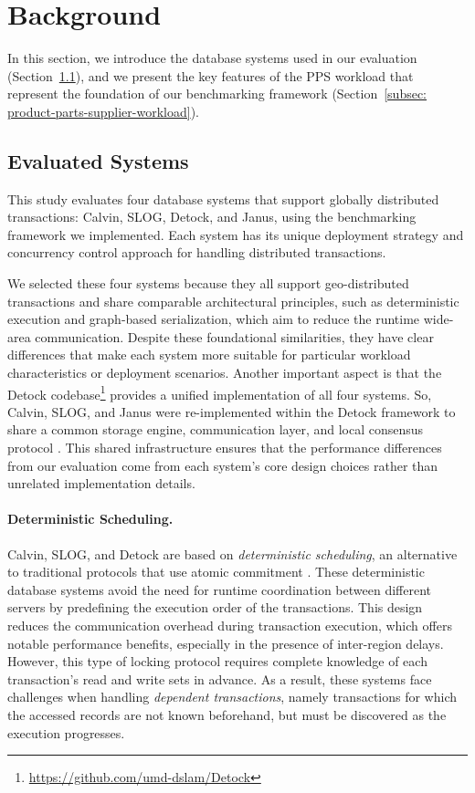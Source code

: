 \section{Background}
\label{sec: background}
In this section, we introduce the database systems used in our evaluation (Section~\ref{subsec: evaluated-systems}), and we present the key features of the PPS workload that represent the foundation of our benchmarking framework (Section~\ref{subsec: product-parts-supplier-workload}).

\subsection{Evaluated Systems}
\label{subsec: evaluated-systems}
This study evaluates four database systems that support globally distributed transactions: Calvin, SLOG, Detock, and Janus, using the benchmarking framework we implemented. Each system has its unique deployment strategy and concurrency control approach for handling distributed transactions.

We selected these four systems because they all support geo-distributed transactions and share comparable architectural principles, such as deterministic execution and graph-based serialization, which aim to reduce the runtime wide-area communication. Despite these foundational similarities, they have clear differences that make each system more suitable for particular workload characteristics or deployment scenarios. Another important aspect is that the Detock codebase\footnote{\url{https://github.com/umd-dslam/Detock}} provides a unified implementation of all four systems. So, Calvin, SLOG, and Janus were re-implemented within the Detock framework to share a common storage engine, communication layer, and local consensus protocol \cite{nguyen2023detock}. This shared infrastructure ensures that the performance differences from our evaluation come from each system's core design choices rather than unrelated implementation details.

\paragraph{Deterministic Scheduling.}
Calvin, SLOG, and Detock are based on \textit{deterministic scheduling}, an alternative to traditional protocols that use atomic commitment \cite{thomson2010case}. These deterministic database systems avoid the need for runtime coordination between different servers by predefining the execution order of the transactions. This design reduces the communication overhead during transaction execution, which offers notable performance benefits, especially in the presence of inter-region delays. However, this type of locking protocol requires complete knowledge of each transaction's read and write sets in advance. As a result, these systems face challenges when handling \textit{dependent transactions}, namely transactions for which the accessed records are not known beforehand, but must be discovered as the execution progresses.

